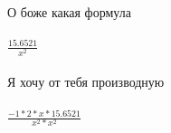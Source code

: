 \documentclass[a4paper, 12pt, oneside]{scrartcl}
\begin{document}
О боже какая формула \\ \\ 
$\frac{15.6521}{x^{2}}$ \\ \\ 
Я хочу от тебя производную \\ \\ 
$\frac{-1*2*x*15.6521}{x^{2}*x^{2}}$ \\ \\ 
\end{document}
